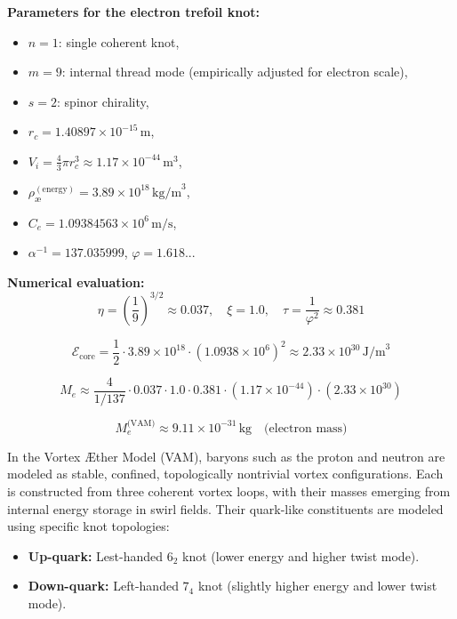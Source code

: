 \documentclass[12pt]{article}
\begin{document}
\noindent
\textbf{Parameters for the electron trefoil knot:}
\begin{itemize}
    \item \(n = 1\): single coherent knot,
    \item \(m = 9\): internal thread mode (empirically adjusted for electron scale),
    \item \(s = 2\): spinor chirality,
    \item \(r_c = 1.40897 \times 10^{-15} \, \text{m}\),
    \item \(V_i = \frac{4}{3} \pi r_c^3 \approx 1.17 \times 10^{-44} \, \text{m}^3\),
    \item \(\rho_\text{\ae}^{(\text{energy})} = 3.89 \times 10^{18} \, \text{kg/m}^3\),
    \item \(C_e = 1.09384563 \times 10^6 \, \text{m/s}\),
    \item \(\alpha^{-1} = 137.035999\), \quad \(\varphi = 1.618...\)
\end{itemize}

\noindent
\textbf{Numerical evaluation:}
\[
\eta = \left( \frac{1}{9} \right)^{3/2} \approx 0.037,
\quad
\xi = 1.0,
\quad
\tau = \frac{1}{\varphi^2} \approx 0.381
\]

\[
\mathcal{E}_\text{core} = \frac{1}{2} \cdot 3.89 \times 10^{18} \cdot (1.0938 \times 10^6)^2 \approx 2.33 \times 10^{30} \, \text{J/m}^3
\]

\[
M_e \approx \frac{4}{1/137} \cdot 0.037 \cdot 1.0 \cdot 0.381 \cdot (1.17 \times 10^{-44}) \cdot (2.33 \times 10^{30})
\]

\[
\boxed{
M_e^\text{(VAM)} \approx 9.11 \times 10^{-31} \, \text{kg}
}
\quad \text{(electron mass)}
\]

  In the Vortex \AE ther Model (VAM), baryons such as the proton and neutron are modeled as stable, confined, topologically nontrivial vortex configurations. Each is constructed from three coherent vortex loops, with their masses emerging from internal energy storage in swirl fields. Their quark-like constituents are modeled using specific knot topologies:

\begin{itemize}
    \item \textbf{Up-quark:} Lest-handed \( 6_2 \) knot (lower energy and higher twist mode).
    \item \textbf{Down-quark:} Left-handed \( 7_4 \) knot (slightly higher energy and lower twist mode).
\end{itemize}
\end{document}
